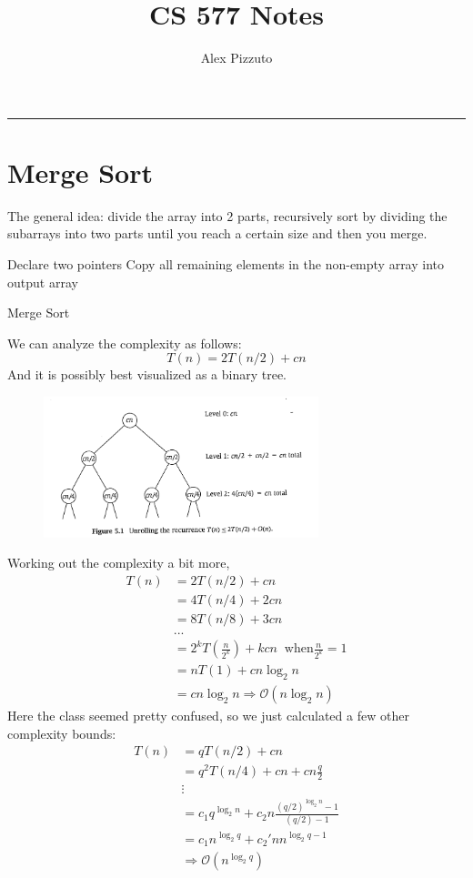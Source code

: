 \documentclass[11pt,letterpaper]{article}
\author{Alex Pizzuto}
\title{CS 577 Notes}
\begin{document}
\date{}
\maketitle
\hrule

\section{Merge Sort}
The general idea: divide the array into 2 parts, recursively sort by dividing the subarrays into two parts until you reach a certain size and then you merge. 

\begin{algorithm}[ht]
	Declare two pointers\;
	Copy all remaining elements in the non-empty array into output array\;
	\caption{Merge Sort}
\end{algorithm}
We can analyze the complexity as follows: 
\begin{equation*}
	T(n) = 2T(n/2) + c n
\end{equation*}
And it is possibly best visualized as a binary tree.
\begin{figure}[h]
\includegraphics[width=8cm]{MergeTree}
\end{figure}
Working out the complexity a bit more, 
\begin{align*}
	T(n) &= 2T(n/2) + c n \\
	&= 4T(n/4) + 2c n \\
	&= 8T(n/8) + 3cn \\
	& . . . \\
	&= 2^k T(\frac{n}{2^k}) + k c n \;\; \mbox{when} \frac{n}{2^k} = 1 \\
	&= n T(1) + c n \log_2 n \\
	&= c n \log_2 n \Rightarrow \mathcal{O}(n\log_2 n)
\end{align*}
Here the class seemed pretty confused, so we just calculated a few other complexity bounds:
\begin{align*}
	T(n) &= q T(n/2) + cn \\
	&= q^2 T(n/4) + cn + cn \frac{q}{2} \\
	& \vdots \\
	&= c_1 q^{\log_2 n} + c_2 n \frac{(q/2)^{\log_2 n}-1}{(q/2)-1} \\
	&= c_1 n^{\log_2 q} + c_2' n n^{\log_2 q -1} \\
	&\Rightarrow \mathcal{O}(n^{\log_2 q})
\end{align*}
\end{document}
